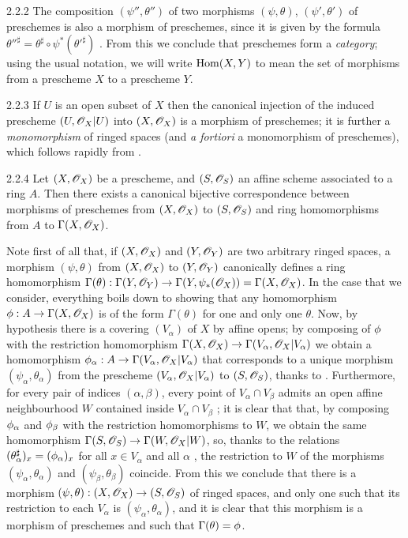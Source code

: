 \begin{env}{2.2.2}
\label{env-1.2.2.2}
The composition $(\psi'',\theta'')$ of two morphisms
$(\psi,\theta)$, $(\psi',\theta')$ of preschemes is also a morphism of
preschemes, since it is given by the formula
${\theta''}^\sharp=\theta^\sharp\circ\psi^*({\theta'}^\sharp)$ . From this
we conclude that preschemes form a \emph{category}; using the usual notation, we
will write ${\mathop{\mathrm{Hom}}\nolimits}(X,Y)$ to mean the set of morphisms from a prescheme $X$ to a
prescheme $Y$.
\end{env}

\begin{env}[Example]{2.2.3}
\label{exm-1.2.2.3}
If $U$ is an open subset of $X$ then the canonical
injection  of the induced prescheme $(U,\mathscr{O}_X|U)$ into
$(X,\mathscr{O}_X)$ is a morphism of preschemes; it is further a \emph{monomorphism} of
ringed spaces (and \emph{a fortiori} a monomorphism of preschemes), which
follows rapidly from .
\end{env}

\begin{envs}[Proposition]{2.2.4}
\label{prop-1.2.2.4}
Let $(X,\mathscr{O}_X)$ be a prescheme, and $(S,\mathscr{O}_S)$ an
affine scheme associated to a ring $A$. Then there exists a canonical bijective
correspondence between morphisms of preschemes from $(X,\mathscr{O}_X)$ to $(S,\mathscr{O}_S)$ and
ring homomorphisms from $A$ to $\Gamma(X,\mathscr{O}_X)$.
\end{envs}

Note first of all that, if $(X,\mathscr{O}_X)$ and $(Y,\mathscr{O}_Y)$ are two arbitrary ringed spaces,
a morphism $(\psi,\theta)$ from $(X,\mathscr{O}_X)$ to $(Y,\mathscr{O}_Y)$ canonically defines a ring
homomorphism
$\Gamma(\theta):\Gamma(Y,\mathscr{O}_Y)\to\Gamma(Y,\psi_*(\mathscr{O}_X))=\Gamma(X,\mathscr{O}_X)$.
In the case that we consider, everything boils down to showing that any
homomorphism $\phi:A\to\Gamma(X,\mathscr{O}_X)$ is of the form $\Gamma(\theta)$
for one and only one $\theta$. Now, by hypothesis there is a covering
$(V_\alpha)$ of $X$ by affine opens; by composing of $\phi$ with the
restriction homomorphism $\Gamma(X,\mathscr{O}_X)\to\Gamma(V_\alpha,\mathscr{O}_X|V_\alpha)$ we
obtain a homomorphism $\phi_\alpha:A\to\Gamma(V_\alpha,\mathscr{O}_X|V_\alpha)$
that corresponds to a unique morphism $(\psi_\alpha,\theta_\alpha)$ from the
prescheme $(V_\alpha,\mathscr{O}_X|V_\alpha)$ to $(S,\mathscr{O}_S)$, thanks to .
Furthermore, for every pair of indices $(\alpha,\beta)$, every point of
$V_\alpha\cap V_\beta$ admits an open affine neighbourhood $W$ contained inside
$V_\alpha\cap V_\beta$ ; it is clear that that, by composing
$\phi_\alpha$ and $\phi_\beta$ with the restriction homomorphisms to $W$,
we obtain the same homomorphism $\Gamma(S,\mathscr{O}_S)\to\Gamma(W,\mathscr{O}_X|W)$, so, thanks
to the relations $(\theta_\alpha^\sharp)_x=(\phi_\alpha)_x$ for all $x\in
V_\alpha$ and all $\alpha$ , the restriction to $W$ of the morphisms
$(\psi_\alpha,\theta_\alpha)$ and $(\psi_\beta,\theta_\beta)$ coincide. From
this we conclude that there is a morphism
$(\psi,\theta):(X,\mathscr{O}_X)\to(S,\mathscr{O}_S)$ of ringed spaces, and only one such
that its restriction to each $V_\alpha$ is $(\psi_\alpha,\theta_\alpha)$, and it
is clear that this morphism is a morphism of preschemes and such that
$\Gamma(\theta)=\phi$.

